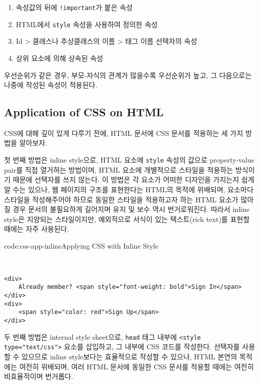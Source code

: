 \begin{enumerate}
    \item 속성값의 뒤에 \texttt{!important}가 붙은 속성
    \item HTML에서 \texttt{style} 속성을 사용하여 정의한 속성
    \item Id {\textgreater} 클래스나 추상클래스의 이름 {\textgreater} 태그 이름 선택자의 속성
    \item 상위 요소에 의해 상속된 속성
\end{enumerate}

우선순위가 같은 경우, 부모-자식의 관계가 많을수록 우선순위가 높고, 그 다음으로는 나중에 작성된 속성이 적용된다.

\subsection*{Application of CSS on HTML}
CSS에 대해 깊이 있게 다루기 전에, HTML 문서에 CSS 문서를 적용하는 세 가지 방법을 알아보자.

첫 번째 방법은 inline style으로, HTML 요소에 \texttt{style} 속성의 값으로 property-value pair를 직접 열거하는 방법이며, HTML 요소에 개별적으로 스타일을 적용하는 방식이기 때문에 선택자를 쓰지 않는다. 이 방법은 각 요소가 어떠한 디자인을 가지는지 쉽게 알 수는 있으나, 웹 페이지의 구조를 표현한다는 HTML의 목적에 위배되며, 요소마다 스타일을 작성해주어야 하므로 동일한 스타일을 적용하고자 하는 HTML 요소가 많아질 경우 문서의 불필요하게 길어지며 유지 및 보수 역시 번거로워진다. 따라서 inline style은 지양되는 스타일이지만, 예외적으로 서식이 있는 텍스트(rich text)를 표현할 때에는 자주 사용된다.

\begin{codeenv}{code:css-app-inline}{Applying CSS with Inline Style}\begin{verbatim}


<div>
    Already member? <span style="font-weight: bold">Sign In</span>
</div>
<div>
    <span style="color: red">Sign Up</span>
</div>
\end{verbatim}
\end{codeenv}

두 번째 방법은 internal style sheet으로, \texttt{head} 태그 내부에 \texttt{<style type="text/css">} 요소를 삽입하고, 그 내부에 CSS 코드를 작성한다. 선택자를 사용할 수 있으므로 inline style보다는 효율적으로 작성할 수 있으나, HTML 본연의 목적에는 여전히 위배되며, 여러 HTML 문서에 동일한 CSS 문서를 적용할 때에는 여전히 비효율적이며 번거롭다.

